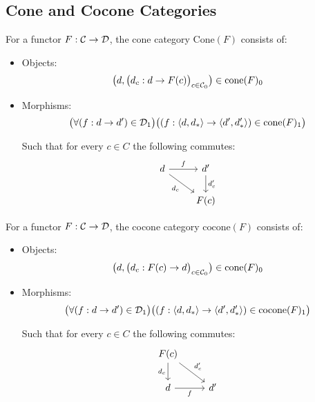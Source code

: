 \subsection{Cone and Cocone Categories}
\begin{definition}
  For a functor $F:\mathcal{C}\to \mathcal{D}$, the cone category $\mathrm{Cone}(F)$ consists of:
  \parencite{fong_spivak:7sketches}

  \begin{itemize}
    \item Objects:
      \[\big(d, \big(d_c: d \to F(c)\big)_{c\in \mathcal{C}_0}\big)\in
        \mathrm{cone}(F)_0\]
    \item Morphisms:
      \[\big(\forall (f : d \to d') \in \mathcal{D}_1\big)
        \big((f: \langle d, d_*\rangle\to \langle d', d'_*\rangle) \in \mathrm{cone}(F)_1\big)\]

      Such that for every $c\in C$ the following commutes:
      \[\begin{tikzcd}
        d & {d'} \\
        & {F(c)}
        \arrow["{d_c}"', from=1-1, to=2-2]
        \arrow["{d'_c}", from=1-2, to=2-2]
        \arrow["f", from=1-1, to=1-2]
      \end{tikzcd}\]
  \end{itemize}
\end{definition}

\begin{definition}
  For a functor $F:\mathcal{C}\to \mathcal{D}$, the cocone category $\mathrm{cocone}(F)$ consists
  of:

  \begin{itemize}
    \item Objects:
      \[\big(d, \big(d_c: F(c) \to d\big)_{c\in \mathcal{C}_0}\big)\in
        \mathrm{cone}(F)_0\]
    \item Morphisms:
      \[\big(\forall (f : d\to d')\in \mathcal{D}_1\big)
        \big((f:\langle d, d_*\rangle\to \langle d', d'_*\rangle)\in \mathrm{cocone}(F)_1\big)\]

      Such that for every $c\in C$ the following commutes:
      \[\begin{tikzcd}[ampersand replacement=\&]
        {F(c)} \\
        d \& {d'}
        \arrow["{d_c}"', from=1-1, to=2-1]
        \arrow["{d'_c}", from=1-1, to=2-2]
        \arrow["f"', from=2-1, to=2-2]
      \end{tikzcd}\]
  \end{itemize}
\end{definition}